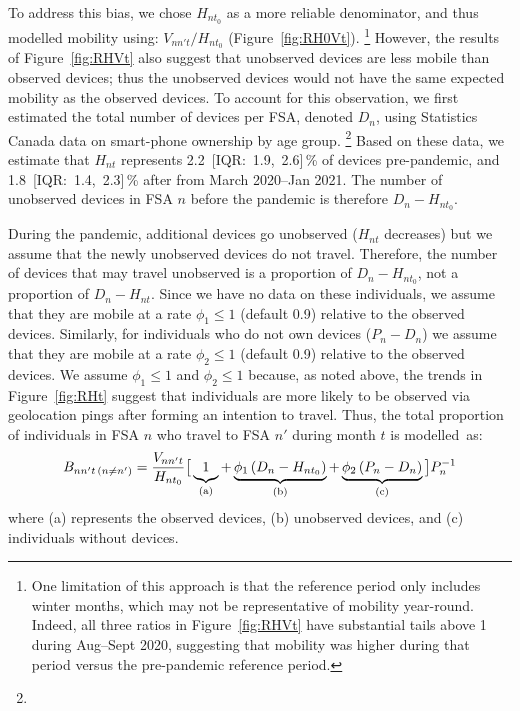 \par
To address this bias, we chose $H_{nt_0}$ as a more reliable denominator,
and thus modelled mobility using: $V_{nn't} / H_{nt_0}$ (Figure~\ref{fig:RH0Vt}).%
\footnote{One limitation of this approach is that the reference period only includes winter months,
  which may not be representative of mobility year-round.
  Indeed, all three ratios in Figure~\ref{fig:RHVt} have substantial tails above 1 during Aug--Sept 2020,
  suggesting that mobility was higher during that period versus the pre-pandemic reference period.}
However, the results of Figure~\ref{fig:RHVt} also suggest that
unobserved devices are less mobile than observed devices;
thus the unobserved devices would not have the same expected mobility as the observed devices.
To account for this observation, we first estimated the total number of devices per FSA, denoted $D_n$,
using Statistics Canada data on smart-phone ownership by age group.%
\footnote{}
Based on these data, we estimate that $H_{nt}$ represents
2.2~[IQR:~1.9,~2.6]\,\% of devices pre-pandemic, and
1.8~[IQR:~1.4,~2.3]\,\% after from March 2020--Jan 2021.
The number of unobserved devices in FSA $n$ before the pandemic is therefore $D_n - H_{nt_0}$.
\par
During the pandemic, additional devices go unobserved ($H_{nt}$ decreases)
but we assume that the newly unobserved devices do not travel.
Therefore, the number of devices that may travel unobserved
is a proportion of $D_n - H_{nt_0}$, not a proportion of $D_n - H_{nt}$.
Since we have no data on these individuals, we assume that they are mobile
at a rate $\phi_1 \le 1$ (default 0.9) relative to the observed devices.
Similarly, for individuals who do not own devices ($P_n - D_n$) we assume that they are mobile
at a rate $\phi_2 \le 1$ (default 0.9) relative to the observed devices.
We assume $\phi_1 \le 1$ and $\phi_2 \le 1$ because, as noted above,
the trends in Figure~\ref{fig:RHt} suggest that
individuals are more likely to be observed via geolocation pings after forming an intention to travel.
Thus, the total proportion of individuals in FSA $n$ who travel to FSA $n'$ during month $t$ is modelled~as:
\begin{equation}\label{eq:Bnnt.inter}
  B_{nn't \,(n\ne n')} = \frac{V_{nn't}}{H_{nt_0}} \big[
  \underbrace{1\vphantom{\phi}}_{\textrm{(a)}}
  + \underbrace{\phi_1 \left(D_n - H_{nt_0}\right)}_{\textrm{(b)}}
  + \underbrace{\phi_2 \left(P_n - D_n\right)}_{\textrm{(c)}} \big] P_n^{-1}
\end{equation}
where (a) represents the observed devices,
(b) unobserved devices, and
(c) individuals without devices.
